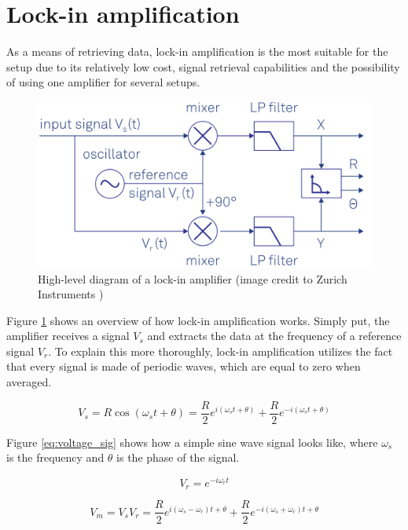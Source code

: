 \section{Lock-in amplification} \label{chap:lockin}
As a means of retrieving data, lock-in amplification is the most suitable for the setup due to its relatively low cost, signal retrieval capabilities and the possibility of using one amplifier for several setups. 

\begin{figure}[ht]
	\centering
	\includegraphics[width=0.7\linewidth]{img/lia_hl_schematic}
	\caption{High-level diagram of a lock-in amplifier (image credit to Zurich Instruments \cite{instruments2018principles})}
	\label{fig:liahlschematic}
\end{figure}

Figure \ref{fig:liahlschematic} shows an overview of how lock-in amplification works. Simply put, the amplifier receives a signal $V_s$ and extracts the data at the frequency of a reference signal $V_r$. To explain this more thoroughly, lock-in amplification utilizes the fact that every signal is made of periodic waves, which are equal to zero when averaged. 

\begin{equation}\label{eq:voltage_sig}
	V_s = R\cos{(\omega_st + \theta)} = \frac{R}{2}e^{i(\omega_st + \theta)} + \frac{R}{2}e^{-i(\omega_st + \theta)}
\end{equation}

Figure \ref{eq:voltage_sig} shows how a simple sine wave signal looks like, where $\omega_s$ is the frequency and $\theta$ is the phase of the signal.

\begin{equation}\label{eq:voltage_ref}
	V_r = e^{-i\omega_rt}
\end{equation}

\begin{equation}\label{eq:voltage_mult}
	V_m = V_sV_r = \frac{R}{2}e^{i(\omega_s -\omega_r)t  + \theta} + \frac{R}{2}e^{-i(\omega_s +\omega_r)t + \theta}
\end{equation}


